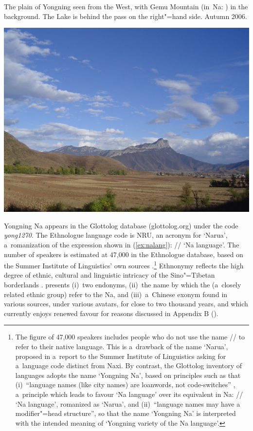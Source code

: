 
\begin{photofigure}[t]
	\caption{The plain of Yongning seen from the West, with Gemu Mountain (in~Na: ) in the background. The Lake is behind the pass on the right"=hand side. Autumn 2006.}
	\includegraphics[width=\textwidth]{figures/YongningPlain08375.jpg}
\end{photofigure}

Yongning Na appears in the Glottolog database (glottolog.org) under the code \textit{yong1270}. The Ethnologue language code is NRU, an acronym for ‘Narua’, a~romanization of the expression shown in (\ref{ex:nalang}): // ‘Na language’. The number of speakers is estimated at 47,000 in the Ethnologue database, based on the Summer Institute of Linguistics' own sources \citep{lewisetal2016}.\footnote{The figure of 47,000 speakers includes people who do not use the name // to refer to their native language. This is a~drawback of the name ‘Narua’, proposed in a~report to the Summer Institute of Linguistics asking for a~language code distinct from {Naxi}. By contrast, the Glottolog inventory of languages adopts the name ‘Yongning Na’, based on principles such as that (i)~“language names (like city names) are loanwords, not code-switches” \citep{haspelmath2017}, a~principle which leads to favour ‘Na language’ over its equivalent in Na: // ‘Na language’, romanized as ‘Narua’, and (ii)~“language names may have a modifier"=head structure”, so that the name ‘Yongning Na’ is interpreted with the intended meaning of ‘Yongning variety of the Na language’.} Ethnonymy reflects the high degree of ethnic, cultural and linguistic intricacy of the Sino"=Tibetan borderlands \citep{gros2014b}.  presents (i)~two endonyms, (ii)~the name by which the   (a~closely related ethnic group) refer to the Na, and (iii)~a~Chinese exonym found in various sources, under various avatars, for close to two thousand years, and which currently enjoys renewed favour for reasons discussed in Appendix B (). 


